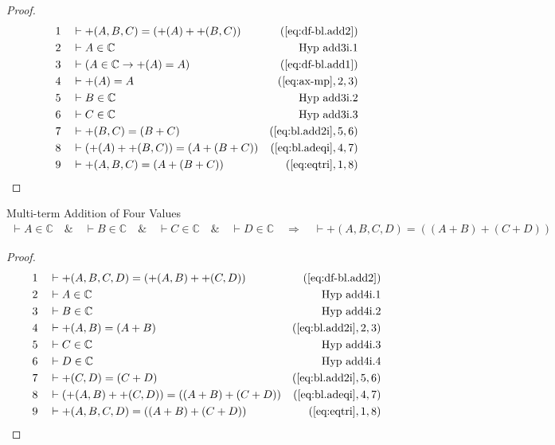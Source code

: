 \begin{proof}
\begin{align}
  1 &&  & \vdash +( A , B , C ) = ( +( A ) + +( B , C ) )&(\mbox{\ref{eq:df-bl.add2}})\notag
  \\ 2 &&  & \vdash A \in \mathbb{C}&\text{Hyp~add3i.1}\notag%
  \\ 3 &&  & \vdash ( A \in \mathbb{C} \rightarrow +( A ) = A )&(\mbox{\ref{eq:df-bl.add1}})\notag
  \\ 4 &&  & \vdash +( A ) = A&(\mbox{\ref{eq:ax-mp}},2,3)\notag
  \\ 5 &&  & \vdash B \in \mathbb{C}&\text{Hyp~add3i.2}\notag%
  \\ 6 &&  & \vdash C \in \mathbb{C}&\text{Hyp~add3i.3}\notag%
  \\ 7 &&  & \vdash +( B , C ) = ( B + C )&(\mbox{\ref{eq:bl.add2i}},5,6)\notag
  \\ 8 &&  & \vdash ( +( A ) + +( B , C ) ) = ( A + ( B + C ) )&(\mbox{\ref{eq:bl.adeqi}},4,7)\notag
  \\ 9 &&  & \vdash +( A , B , C ) = ( A + ( B + C ) )&(\mbox{\ref{eq:eqtri}},1,8)\notag
\end{align}
\end{proof}

\begin{lemma} Multi-term Addition of Four Values
\begin{align}
\vdash A \in \mathbb{C}\quad\&\quad \vdash B \in \mathbb{C}\quad\&\quad \vdash
    C \in \mathbb{C}\quad\&\quad \vdash D \in \mathbb{C}\quad\Rightarrow\quad
    \vdash +( A , B , C , D ) = ( ( A + B ) + ( C + D )
    )\label{eq:bl.add4i}\tag{bl.add4i}
\end{align}
\end{lemma}

\begin{proof}
\begin{align}
  1 &&  & \vdash +( A , B , C , D ) = ( +( A , B ) + +( C , D ) )&(\mbox{\ref{eq:df-bl.add2}})\notag
  \\ 2 &&  & \vdash A \in \mathbb{C}&\text{Hyp~add4i.1}\notag%
  \\ 3 &&  & \vdash B \in \mathbb{C}&\text{Hyp~add4i.2}\notag%
  \\ 4 &&  & \vdash +( A , B ) = ( A + B )&(\mbox{\ref{eq:bl.add2i}},2,3)\notag
  \\ 5 &&  & \vdash C \in \mathbb{C}&\text{Hyp~add4i.3}\notag%
  \\ 6 &&  & \vdash D \in \mathbb{C}&\text{Hyp~add4i.4}\notag%
  \\ 7 &&  & \vdash +( C , D ) = ( C + D )&(\mbox{\ref{eq:bl.add2i}},5,6)\notag
  \\ 8 &&  & \vdash ( +( A , B ) + +( C , D ) ) = ( ( A + B ) + ( C + D ) )&(\mbox{\ref{eq:bl.adeqi}},4,7)\notag
  \\ 9 &&  & \vdash +( A , B , C , D ) = ( ( A + B ) + ( C + D ) )&(\mbox{\ref{eq:eqtri}},1,8)\notag
\end{align}
\end{proof}

